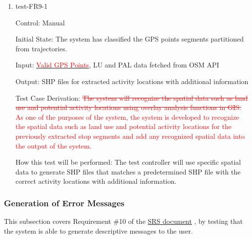 \documentclass[12pt, titlepage]{article}
\begin{document}
\begin{enumerate}

\item{test-FR9-1\\} \label{test-FR9-1}

Control: Manual 
					
Initial State: The system has classified the GPS points segments partitioned from trajectories.
					
Input: \href{https://github.com/paezha/PyERT-BLACK/blob/rev0-test/quarto-example/data/sample-gps/sample-gps-1.csv}{\textcolor{red}{Valid GPS Points}}, LU and PAL data fetched from OSM API
					
Output: SHP files for extracted activity locations with additional information 

Test Case Derivation: \textcolor{red}{\sout{The system will recognize the spatial data such as land use and potential activity locations using overlay analysis functions in GIS.} As one of the purposes of the system, the system is developed to recognize the spatial data such as land use and potential activity locations for the previously extracted stop segments and add any recognized spatial data into the output of the system.}
					
How this test will be performed: The test controller will use specific spatial data to generate SHP files that matches a predetermined SHP file with the correct activity locations with additional information.

\end{enumerate}

\subsubsection{Generation of Error Messages}

This subsection covers Requirement \#10 of the \href{https://github.com/paezha/PyERT-BLACK/blob/main/docs/SRS/SRS.pdf}{SRS document} \citep{SRS}, by testing that the system is able to generate descriptive messages to the user.
\end{document}
